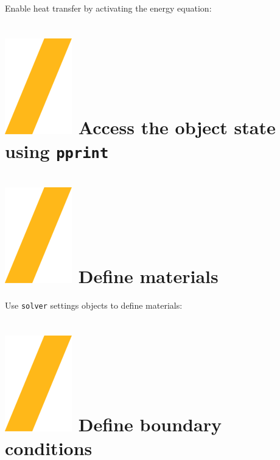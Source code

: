 \documentclass[9pt,landscape]{article}
\begin{document}
\begin{multicols}{3}
Enable heat transfer by activating the energy equation:


\section{\includegraphics[height=\fontcharht\font`\S]{slash.png} Access the object state using \texttt{pprint}}


\section{\includegraphics[height=\fontcharht\font`\S]{slash.png}  Define materials}
Use \texttt{solver} settings objects to define materials:

\vfill

\section{\includegraphics[height=\fontcharht\font`\S]{slash.png}  Define boundary conditions}


\end{multicols}
\end{document}
